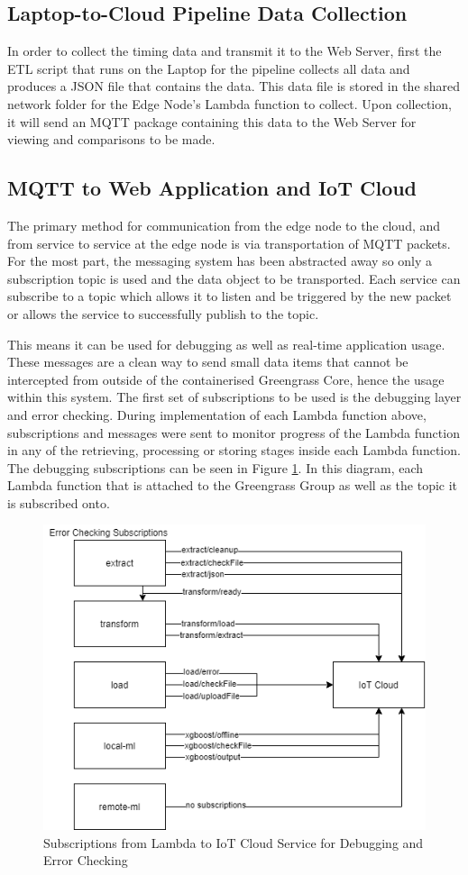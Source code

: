 \subsection{Laptop-to-Cloud Pipeline Data Collection}
In order to collect the timing data and transmit it to the Web Server, first the ETL script that runs on the Laptop for the pipeline collects all data and produces a JSON file that contains the data. This data file is stored in the shared network folder for the Edge Node's Lambda function to collect. Upon collection, it will send an MQTT package containing this data to the Web Server for viewing and comparisons to be made.

\subsection{MQTT to Web Application and IoT Cloud}
The primary method for communication from the edge node to the cloud, and from service to service at the edge node is via transportation of MQTT packets. For the most part, the messaging system has been abstracted away so only a subscription topic is used and the data object to be transported. Each service can subscribe to a topic which allows it to listen and be triggered by the new packet or allows the service to successfully publish to the topic.

This means it can be used for debugging as well as real-time application usage. These messages are a clean way to send small data items that cannot be intercepted from outside of the containerised Greengrass Core, hence the usage within this system. The first set of subscriptions to be used is the debugging layer and error checking. During implementation of each Lambda function above, subscriptions and messages were sent to monitor progress of the Lambda function in any of the retrieving, processing or storing stages inside each Lambda function. The debugging subscriptions can be seen in Figure \ref{fig:cloud_mqqt_layer}. In this diagram, each Lambda function that is attached to the Greengrass Group as well as the topic it is subscribed onto.

\begin{figure}[ht]
    \centering
    \includegraphics[width=0.75\linewidth]{pages/Chapter4/Chapter 4 Images/LambdaFns/iot_cloud_mqqt.png}
    \caption{Subscriptions from Lambda to IoT Cloud Service for Debugging and Error Checking}
    \label{fig:cloud_mqqt_layer}
\end{figure}

